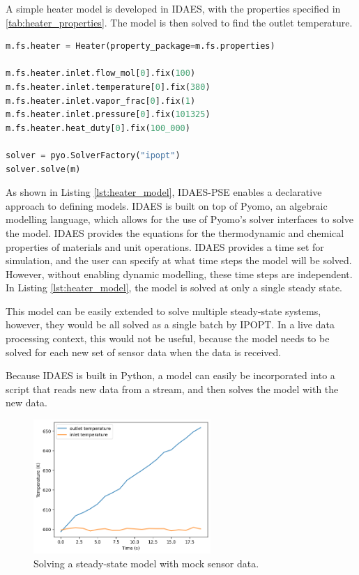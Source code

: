 \documentclass[12pt]{article}
\begin{document}
A simple heater model is developed in IDAES, with the properties specified in \cref{tab:heater_properties}. The model is then solved to find the outlet temperature.

\begin{lstlisting}[language=Python,caption=Defining a simple heater model in IDAES,label=lst:heater_model]
m.fs.heater = Heater(property_package=m.fs.properties)

m.fs.heater.inlet.flow_mol[0].fix(100)
m.fs.heater.inlet.temperature[0].fix(380)
m.fs.heater.inlet.vapor_frac[0].fix(1)
m.fs.heater.inlet.pressure[0].fix(101325)
m.fs.heater.heat_duty[0].fix(100_000)

solver = pyo.SolverFactory("ipopt")
solver.solve(m)

\end{lstlisting}

As shown in Listing \ref{lst:heater_model}, IDAES-PSE enables a declarative approach to defining models. IDAES is built on top of Pyomo, an algebraic modelling language, which allows for the use of Pyomo's solver interfaces to solve the model. IDAES provides the equations for the thermodynamic and chemical properties of materials and unit operations. IDAES provides a time set for simulation, and the user can specify at what time steps the model will be solved. However, without enabling dynamic modelling, these time steps are independent. In Listing \ref{lst:heater_model}, the model is solved at only a single steady state.

This model can be easily extended to solve multiple steady-state systems, however, they would be all solved as a single batch by IPOPT. In a live data processing context, this would not be useful, because the model needs to be solved for each new set of sensor data when the data is received. 

Because IDAES is built in Python, a model can easily be incorporated into a script that reads new data from a stream, and then solves the model with the new data. 

\begin{figure}
    \centering
    \includegraphics[width=0.6\textwidth]{live_data_processing.png}
    \caption{Solving a steady-state model with mock sensor data.}
    \label{fig:live_mss}
\end{figure}
\end{document}
